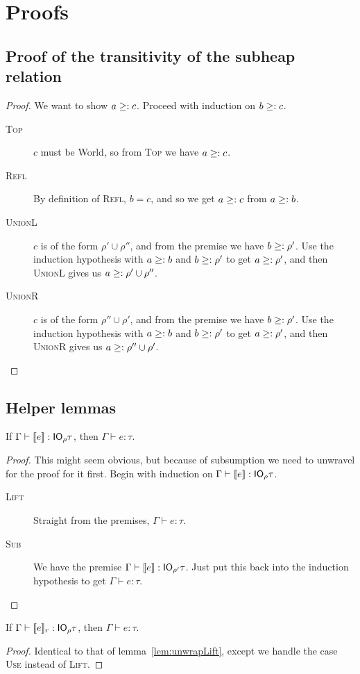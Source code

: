 \appendix
\chapter{Proofs}

\section{Proof of the transitivity of the subheap relation} \label{proof:subheaptransitive}
\begin{proof}
  We want to show $a \subtyp c$. Proceed with induction on $b \subtyp c$.
  \begin{description}
  \item[\rm\textsc{Top}]
    $c$ must be \textsf{World}, so from \textsc{Top} we have $a
    \subtyp c$.
  \item[\rm\textsc{Refl}] By definition of \textsc{Refl}, $b =
    c$, and so we get $a \subtyp c$ from $a \subtyp b$.
  \item[\rm\textsc{UnionL}] $c$ is of the form $\rho' \cup \rho''$, and
    from the premise we have $b \subtyp \rho'$. Use the induction
    hypothesis with $a \subtyp b$ and $b \subtyp \rho'$ to get $a \subtyp
    \rho'$, and then \textsc{UnionL} gives us $a \subtyp \rho' \cup \rho''$.
  \item[\rm\textsc{UnionR}]  $c$ is of the form $\rho'' \cup \rho'$, and
    from the premise we have $b \subtyp \rho'$. Use the induction
    hypothesis with $a \subtyp b$ and $b \subtyp \rho'$ to get $a \subtyp
    \rho'$, and then \textsc{UnionR} gives us $a \subtyp \rho'' \cup \rho'$.
  \end{description}
\end{proof}

\section{Helper lemmas}
\begin{lemma} \label{lem:unwrapLift}
  If $\Gamma \vdash \lift{e} : \IO_\rho \tau$, then $\Gamma \vdash e : \tau$.
\end{lemma}

\begin{proof}
  This might seem obvious, but because of subsumption we need to
  unwravel for the proof for it first. Begin with induction on $\Gamma \vdash
  \lift{e} : \IO_\rho \tau$.
  \begin{description}
  \item[\rm\textsc{Lift}] Straight from the premises, $\Gamma \vdash e : \tau$.
  \item[\rm\textsc{Sub}] We have the premise ${\Gamma \vdash \lift{e} : \IO_{\rho'}
    \tau}$. Just put this back into the induction hypothesis to get ${\Gamma \vdash e
    : \tau}$.
  \end{description}
\end{proof}

\begin{lemma} \label{lem:unwrapUse}
  If $\Gamma \vdash \use{r}{e} : \IO_\rho \tau$, then $\Gamma \vdash e : \tau$.
\end{lemma}
\begin{proof}
  Identical to that of lemma~\ref{lem:unwrapLift}, except we handle
  the case \textsc{Use} instead of \textsc{Lift}.
\end{proof}